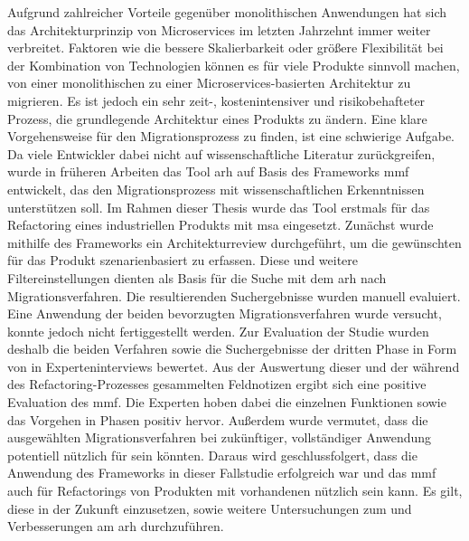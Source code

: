 \documentclass[
  ngerman,
  a4paper,  %
  twoside,  %
  bibliography=totoc,
  headsepline,
  cleardoublepage=empty,
  parskip=half,
  draft=false
]{scrbook}
\begin{document}
Aufgrund zahlreicher Vorteile gegenüber monolithischen Anwendungen hat sich das Ar\-chi\-tek\-tur\-prin\-zip von Microservices im letzten Jahrzehnt immer weiter verbreitet.
Faktoren wie die bes\-sere Skalierbarkeit oder größere Flexibilität bei der Kombination von Technologien können es für viele Produkte sinnvoll machen, von einer monolithischen zu einer Microservices-basierten Architektur zu migrieren.
Es ist jedoch ein sehr zeit-, kostenintensiver und risikobehafteter Prozess, die grundlegende Architektur eines Produkts zu ändern.
Eine klare Vorgehensweise für den Migrationsprozess zu finden, ist eine schwierige Aufgabe.
Da viele Entwickler dabei nicht auf wissenschaftliche Literatur zurückgreifen, wurde in früheren Arbeiten das Tool \acrfull{arh} auf Basis des Frameworks \acrfull{mmf} entwickelt, das den Migrationsprozess mit wissenschaftlichen Erkenntnissen unterstützen soll.
Im Rahmen dieser Thesis wurde das Tool erstmals für das Refactoring eines industriellen Produkts mit \acrlong{msa} eingesetzt.
Zunächst wurde mithilfe des Frameworks ein Architekturreview durchgeführt, um die gewünschten  für das Produkt \jf szenarienbasiert zu erfassen.
Diese und weitere Filtereinstellungen dienten als Basis für die Suche mit dem \acrshort{arh} nach Migrationsverfahren.
Die resultierenden Suchergebnisse wurden manuell evaluiert.
Eine Anwendung der beiden bevorzugten Migrationsverfahren wurde versucht, konnte jedoch nicht fertiggestellt werden.
Zur Evaluation der Studie wurden deshalb die beiden Verfahren sowie die Suchergebnisse der dritten Phase in Form von \bpp in Experteninterviews bewertet.
Aus der Auswertung dieser und der während des Refactoring-Prozesses gesammelten Feldnotizen ergibt sich eine positive Evaluation des \acrshort{mmf}.
Die Experten hoben dabei die einzelnen Funktionen sowie das Vorgehen in Phasen positiv hervor.
Außerdem wurde vermutet, dass die ausgewählten Migrationsverfahren bei zukünftiger, vollständiger Anwendung potentiell nützlich für \jf sein könnten.
Daraus wird geschlussfolgert, dass die Anwendung des Frameworks in dieser Fallstudie erfolgreich war und das \acrshort{mmf} auch für Refactorings von Produkten mit vorhandenen  nützlich sein kann.
Es gilt, diese in der Zukunft einzusetzen, sowie weitere Untersuchungen zum und Verbesserungen am \acrshort{arh} durchzuführen.

\end{document}
